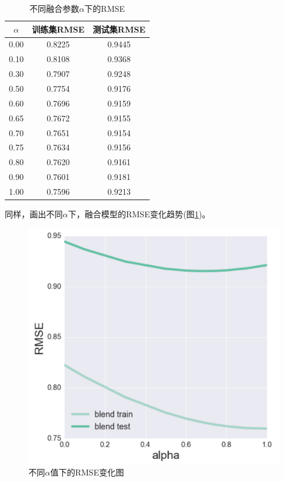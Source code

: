 \documentclass[utf8, a4paper, 11pt, onecolumn]{ctexart}
\begin{document}
\begin{spacing}{1.3}
\begin{table}[h]
	\centering
	\begin{tabular}{|c|c|c|}
		\hline
		\textbf{$\alpha$} & 训练集RMSE & 测试集RMSE \\
		\hline
		0.00 & 0.8225 & 0.9445 \\
		\hline
		0.10 & 0.8108 & 0.9368 \\
		\hline
		0.30 & 0.7907 & 0.9248 \\
		\hline
		0.50 & 0.7754 & 0.9176 \\
		\hline
		0.60 & 0.7696 & 0.9159 \\
		\hline
		0.65 & 0.7672 & 0.9155 \\
		\hline
		0.70 & 0.7651 & 0.9154 \\
		\hline
		0.75 & 0.7634 & 0.9156 \\
		\hline
		0.80 & 0.7620 & 0.9161 \\
		\hline
		0.90 & 0.7601 & 0.9181 \\
		\hline
		1.00 & 0.7596 & 0.9213 \\
		\hline
	\end{tabular}
	\caption{不同融合参数$\alpha$下的RMSE}
	\label{alpha-table}
\end{table}

同样，画出不同$\alpha$下，融合模型的RMSE变化趋势(图\ref{alpha-figure})。

\begin{figure}[ht]
	\centering
	\includegraphics[width=0.8\linewidth]{alpha-figure.png}
	\caption{不同$\alpha$值下的RMSE变化图}
	\label{alpha-figure}
\end{figure}


\end{spacing}
\end{document}
